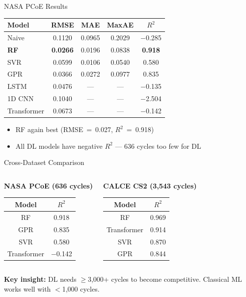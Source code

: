 \documentclass[aspectratio=169,11pt]{beamer}
\begin{document}
\begin{frame}{NASA PCoE Results}
\begin{table}[H]
\centering
\small
\begin{tabular}{lcccc}
\toprule
\textbf{Model} & \textbf{RMSE} & \textbf{MAE} & \textbf{MaxAE} & \textbf{$R^2$} \\
\midrule
Naive & 0.1120 & 0.0965 & 0.2029 & $-$0.285 \\
\textbf{RF} & \textbf{0.0266} & 0.0196 & 0.0838 & \textbf{0.918} \\
SVR & 0.0599 & 0.0106 & 0.0540 & 0.580 \\
GPR & 0.0366 & 0.0272 & 0.0977 & 0.835 \\
\midrule
LSTM & 0.0476 & --- & --- & $-$0.135 \\
1D CNN & 0.1040 & --- & --- & $-$2.504 \\
Transformer & 0.0673 & --- & --- & $-$0.142 \\
\bottomrule
\end{tabular}
\end{table}
\vspace{-0.5em}
\begin{itemize}[nosep,small]
    \item RF again best (RMSE~=~0.027, $R^2$~=~0.918)
    \item All DL models have negative $R^2$ --- 636 cycles too few for DL
\end{itemize}
\end{frame}

\begin{frame}{Cross-Dataset Comparison}
\begin{columns}
\begin{center}
\textbf{NASA PCoE (636 cycles)}\\[0.5em]
\begin{tabular}{cc}
\toprule
Model & $R^2$ \\
\midrule
RF & 0.918 \\
GPR & 0.835 \\
SVR & 0.580 \\
Transformer & $-$0.142 \\
\bottomrule
\end{tabular}
\end{center}

\begin{center}
\textbf{CALCE CS2 (3,543 cycles)}\\[0.5em]
\begin{tabular}{cc}
\toprule
Model & $R^2$ \\
\midrule
RF & 0.969 \\
Transformer & 0.914 \\
SVR & 0.870 \\
GPR & 0.844 \\
\bottomrule
\end{tabular}
\end{center}
\end{columns}
\vspace{1em}
\textbf{Key insight:} DL needs $\geq$3,000+ cycles to become competitive. Classical ML works well with $<$1,000 cycles.
\end{frame}
\end{document}
